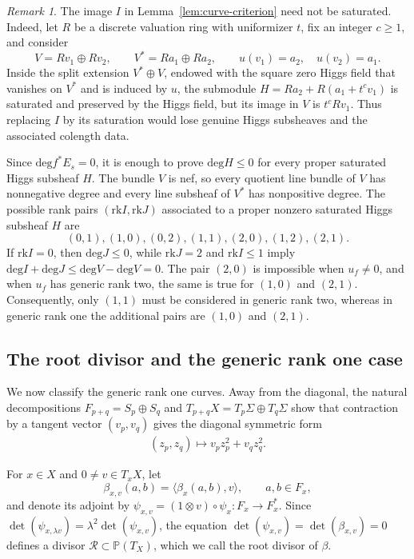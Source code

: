 \documentclass[oneside,11pt]{amsart}
\theoremstyle{definition}
\theoremstyle{remark}
\newtheorem{rem}[thm]{Remark}
\numberwithin{thm}{section}
\numberwithin{equation}{section}
\begin{document}
\begin{rem}
The image $I$ in Lemma~\ref{lem:curve-criterion} need not be saturated. Indeed, let $R$ be a discrete valuation ring with uniformizer $t$, fix an integer $c\geq1$, and consider
\[
 V=Rv_1\oplus Rv_2,\qquad V^*=Ra_1\oplus Ra_2,
 \qquad u(v_1)=a_2,\quad u(v_2)=a_1.
\]
Inside the split extension $V^*\oplus V$, endowed with the square zero Higgs field that vanishes on $V^*$ and is induced by $u$, the submodule $H=Ra_2+R(a_1+t^cv_1)$ is saturated and preserved by the Higgs field, but its image in $V$ is
$t^cRv_1$. Thus replacing $I$ by its saturation would lose genuine Higgs subsheaves and the associated colength data.
\end{rem}



Since $\mathrm{deg} f^*E_s=0$, it is enough to prove
$\mathrm{deg}H\leq0$ for every proper saturated Higgs subsheaf $H$.  The bundle $V$ is nef, so every quotient line bundle of $V$ has nonnegative degree and every line subsheaf of $V^*$ has nonpositive degree.  The possible rank pairs $(\mathrm{rk}I,\mathrm{rk}J)$ associated to a proper nonzero saturated Higgs subsheaf $H$ are
\[
 (0,1),(1,0),(0,2),(1,1),(2,0),(1,2),(2,1).
\]
If $\mathrm{rk}I=0$, then $\mathrm{deg}J\leq0$, while
$\mathrm{rk}J=2$ and $\mathrm{rk}I\leq1$ imply
$\mathrm{deg}I+\mathrm{deg}J\leq\mathrm{deg}V-\mathrm{deg}V=0$.  The pair $(2,0)$ is impossible when $u_f\neq0$, and when $u_f$ has generic rank two, the same is true for $(1,0)$ and $(2,1)$.  Consequently, only $(1,1)$ must be considered in generic rank two, whereas in generic rank one the additional pairs are $(1,0)$ and $(2,1)$.


\subsection{The root divisor and the generic rank one case}


We now classify the generic rank one curves.  Away from the diagonal, the natural decompositions $F_{p+q}=S_p\oplus S_q$ and
$T_{p+q}X=T_p\Sigma\oplus T_q\Sigma$ show that contraction by a tangent vector $(v_p,v_q)$ gives the diagonal symmetric form
\begin{align}\label{eq:off-diagonal-form}
 (z_p,z_q)\longmapsto v_pz_p^2+v_qz_q^2.
\end{align}

For $x\in X$ and $0\neq v\in T_xX$, let
\[
 \beta_{x,v}(a,b)=\langle\beta_x(a,b),v\rangle,
 \qquad a,b\in F_x,
\]
and denote its adjoint by $\psi_{x,v}=(1\otimes v)\circ\psi_x:F_x\to F_x^*$.  Since $\det(\psi_{x,\lambda v})=\lambda^2\det(\psi_{x,v})$, the equation $
 \det(\psi_{x,v})=\det(\beta_{x,v})=0$ defines a divisor $\mathscr{R}\subset\mathbb{P}(T_X)$, which we call the
root divisor of $\beta$.
\end{document}
